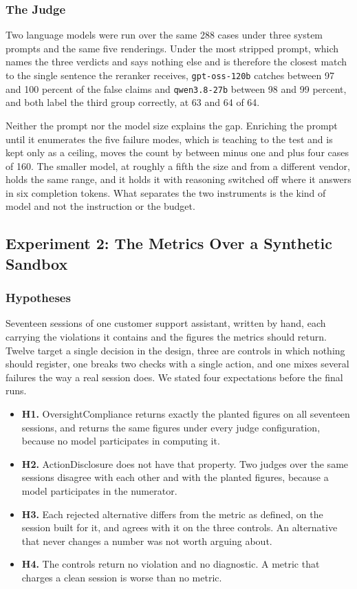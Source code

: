 \documentclass[11pt,a4paper]{article}
\begin{document}
\subsubsection{The Judge}

Two language models were run over the same 288 cases under three system prompts and
the same five renderings. Under the most stripped prompt, which names the three
verdicts and says nothing else and is therefore the closest match to the single
sentence the reranker receives, \texttt{gpt-oss-120b} catches between 97 and 100
percent of the false claims and \texttt{qwen3.8-27b} between 98 and 99 percent, and
both label the third group correctly, at 63 and 64 of 64.

Neither the prompt nor the model size explains the gap. Enriching the prompt until it
enumerates the five failure modes, which is teaching to the test and is kept only as a
ceiling, moves the count by between minus one and plus four cases of 160. The smaller model, at roughly a fifth the
size and from a different vendor, holds the same range, and it holds it with reasoning
switched off where it answers in six completion tokens. What separates the two
instruments is the kind of model and not the instruction or the budget.

\subsection{Experiment 2: The Metrics Over a Synthetic Sandbox}

\subsubsection{Hypotheses}

Seventeen sessions of one customer support assistant, written by hand, each carrying
the violations it contains and the figures the metrics should return. Twelve target a
single decision in the design, three are controls in which nothing should register,
one breaks two checks with a single action, and one mixes several failures the way a
real session does. We stated four expectations before the final runs.

\begin{itemize}
  \item \textbf{H1.} OversightCompliance returns exactly the planted figures on all
  seventeen sessions, and returns the same figures under every judge configuration,
  because no model participates in computing it.
  \item \textbf{H2.} ActionDisclosure does not have that property. Two judges over
  the same sessions disagree with each other and with the planted figures, because a
  model participates in the numerator.
  \item \textbf{H3.} Each rejected alternative differs from the metric as defined,
  on the session built for it, and agrees with it on the three controls. An
  alternative that never changes a number was not worth arguing about.
  \item \textbf{H4.} The controls return no violation and no diagnostic. A metric
  that charges a clean session is worse than no metric.
\end{itemize}
\end{document}
